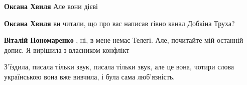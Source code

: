 \begin{itemize}
\begin{itemize}
\textbf{Оксана Хвиля} Але вони дієві

 
\textbf{Оксана Хвиля} ви читали, що про вас написав гівно канал Добкіна Труха?

 
\textbf{Віталій Пономаренко} , ні, в мене немає Телегі. Але, почитайте мій останній допис. Я вирішила з власником конфлікт
\end{itemize}

 
З'їздила, писала тільки звук, писала тільки звук, але це вона, чотири слова
українською вона вже вивчила, і була сама люб'язність.

\end{itemize}

